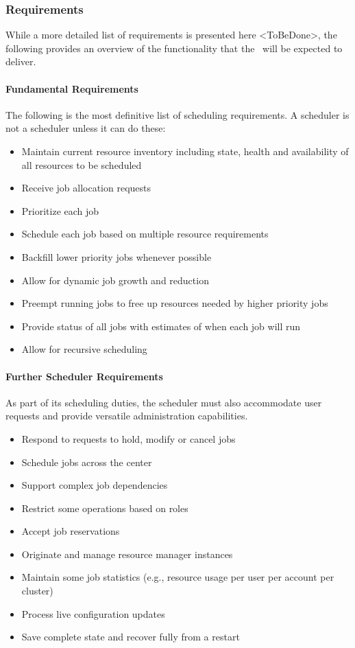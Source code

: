 \subsubsection{Requirements}

While a more detailed list of requirements is presented here
<ToBeDone>, the following provides an overview of the functionality
that the \ngjs\ will be expected to deliver.

\paragraph{Fundamental Requirements}

The following is the most definitive list of scheduling requirements.
A scheduler is not a scheduler unless it can do these:

\begin{itemize}
  \item Maintain current resource inventory including state, health
    and availability of all resources to be scheduled
  \item Receive job allocation requests
  \item Prioritize each job
  \item Schedule each job based on multiple resource requirements
  \item Backfill lower priority jobs whenever possible
  \item Allow for dynamic job growth and reduction
  \item Preempt running jobs to free up resources needed by higher priority jobs
  \item Provide status of all jobs with estimates of when each job will run
  \item Allow for recursive scheduling
\end{itemize}

\paragraph{Further Scheduler Requirements}

As part of its scheduling duties, the scheduler must also accommodate
user requests and provide versatile administration capabilities.

\begin{itemize}
  \item Respond to requests to hold, modify or cancel jobs
  \item Schedule jobs across the center
  \item Support complex job dependencies
  \item Restrict some operations based on roles
  \item Accept job reservations
  \item Originate and manage resource manager instances
  \item Maintain some job statistics (e.g., resource usage per user
    per account per cluster)
  \item Process live configuration updates
  \item Save complete state and recover fully from a restart
\end{itemize}

